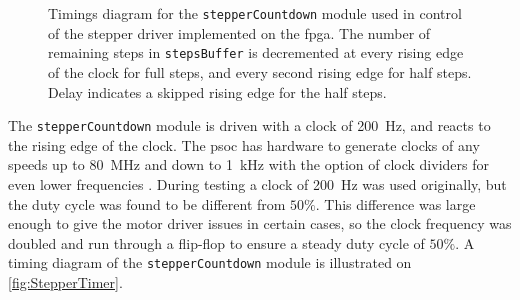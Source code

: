 \begin{figure}[t]
	\centering
	\parnotereset
		\parnotes
	\caption{Timings diagram for the \texttt{stepperCountdown} module used in control of the stepper driver implemented on the \gls{fpga}. The number of remaining steps in \texttt{stepsBuffer} is decremented at every rising edge of the clock for full steps, and every second rising edge for half steps. Delay indicates a skipped rising edge for the half steps.}
	\label{fig:StepperTimer}
\end{figure}

The \texttt{stepperCountdown} module is driven with a clock of \SI{200}{\hertz}, and reacts to the rising edge of the clock. The \gls{psoc} has hardware to generate clocks of any speeds up to \SI{80}{\mega\hertz} and down to \SI{1}{\kilo\hertz} with the option of clock dividers for even lower frequencies \citep{datasheet:PSoC5LP:_CY8C58LP_Family}. During testing a clock of \SI{200}{\hertz} was used originally, but the duty cycle was found to be different from $50\%$. This difference was large enough to give the motor driver issues in certain cases, so the clock frequency was doubled and run through a flip-flop to ensure a steady duty cycle of $50 \%$. A timing diagram of the \texttt{stepperCountdown} module is illustrated on \autoref{fig:StepperTimer}.

